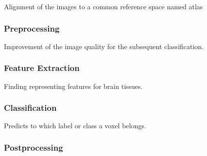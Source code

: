\documentclass[journal]{IEEEtran}
\begin{document}
Alignment of the images to a common reference space named atlas

\subsubsection{Preprocessing}

Improvement of the image quality for the subsequent classification.

\subsubsection{Feature Extraction}

Finding representing features for brain tissues.

\subsubsection{Classification}

Predicts to which label or class a voxel belongs.

\subsubsection{Postprocessing}
\end{document}
